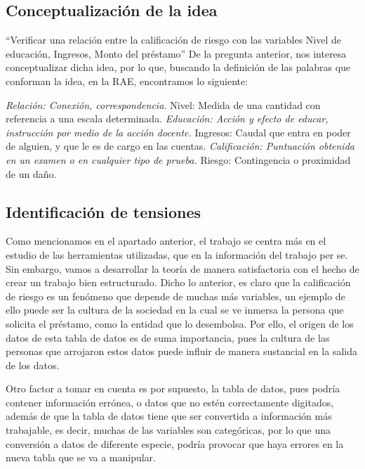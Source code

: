 \documentclass[
  letterpaper,
  DIV=11,
  numbers=noendperiod]{scrreprt}
\begin{document}
\subsection{Conceptualización de la
idea}\label{conceptualizaciuxf3n-de-la-idea}

``Verificar una relación entre la calificación de riesgo con las
variables Nivel de educación, Ingresos, Monto del préstamo'' De la
pregunta anterior, nos interesa conceptualizar dicha idea, por lo que,
buscando la definición de las palabras que conforman la idea, en la RAE,
encontramos lo siguiente:

\emph{Relación: Conexión, correspondencia. }Nivel: Medida de una
cantidad con referencia a una escala determinada. \emph{Educación:
Acción y efecto de educar, instrucción por medio de la acción docente.
}Ingresos: Caudal que entra en poder de alguien, y que le es de cargo en
las cuentas. \emph{Calificación: Puntuación obtenida en un examen o en
cualquier tipo de prueba. }Riesgo: Contingencia o proximidad de un daño.

\subsection{Identificación de
tensiones}\label{identificaciuxf3n-de-tensiones}

Como mencionamos en el apartado anterior, el trabajo se centra más en el
estudio de las herramientas utilizadas, que en la información del
trabajo per se. Sin embargo, vamos a desarrollar la teoría de manera
satisfactoria con el hecho de crear un trabajo bien estructurado. Dicho
lo anterior, es claro que la calificación de riesgo es un fenómeno que
depende de muchas más variables, un ejemplo de ello puede ser la cultura
de la sociedad en la cual se ve inmersa la persona que solicita el
préstamo, como la entidad que lo desembolsa. Por ello, el origen de los
datos de esta tabla de datos es de suma importancia, pues la cultura de
las personas que arrojaron estos datos puede influir de manera
sustancial en la salida de los datos.

Otro factor a tomar en cuenta es por supuesto, la tabla de datos, pues
podría contener información errónea, o datos que no estén correctamente
digitados, además de que la tabla de datos tiene que ser convertida a
información más trabajable, es decir, muchas de las variables son
categóricas, por lo que una conversión a datos de diferente especie,
podría provocar que haya errores en la nueva tabla que se va a
manipular.
\end{document}
